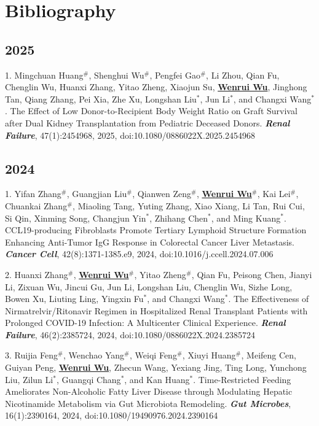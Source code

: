 \documentclass{article}
\begin{document}
\section*{Bibliography}

\subsection*{2025}

1. Mingchuan Huang$^{\#}$, Shenghui Wu$^{\#}$, Pengfei Gao$^{\#}$, Li Zhou, Qian Fu, Chenglin Wu, Huanxi Zhang, Yitao Zheng, Xiaojun Su, \underline{\textbf{Wenrui Wu}}, Jinghong Tan, Qiang Zhang, Pei Xia, Zhe Xu, Longshan Liu$^{*}$, Jun Li$^{*}$, and Changxi Wang$^{*}$. The Effect of Low Donor-to-Recipient Body Weight Ratio on Graft Survival after Dual Kidney Transplantation from Pediatric Deceased Donors. \textbf{\textit{Renal Failure}}, 47(1):2454968, 2025, doi:10.1080/0886022X.2025.2454968

\subsection*{2024}

1. Yifan Zhang$^{\#}$, Guangjian Liu$^{\#}$, Qianwen Zeng$^{\#}$, \underline{\textbf{Wenrui Wu}}$^{\#}$, Kai Lei$^{\#}$, Chuankai Zhang$^{\#}$, Miaoling Tang, Yuting Zhang, Xiao Xiang, Li Tan, Rui Cui, Si Qin, Xinming Song, Changjun Yin$^{*}$, Zhihang Chen$^{*}$, and Ming Kuang$^{*}$. CCL19-producing Fibroblasts Promote Tertiary Lymphoid Structure Formation Enhancing Anti-Tumor IgG Response in Colorectal Cancer Liver Metastasis. \textbf{\textit{Cancer Cell}}, 42(8):1371-1385.e9, 2024, doi:10.1016/j.ccell.2024.07.006

2. Huanxi Zhang$^{\#}$, \underline{\textbf{Wenrui Wu}}$^{\#}$, Yitao Zheng$^{\#}$, Qian Fu, Peisong Chen, Jianyi Li, Zixuan Wu, Jincui Gu, Jun Li, Longshan Liu, Chenglin Wu, Sizhe Long, Bowen Xu, Liuting Ling, Yingxin Fu$^{*}$, and Changxi Wang$^{*}$. The Effectiveness of Nirmatrelvir/Ritonavir Regimen in Hospitalized Renal Transplant Patients with Prolonged COVID-19 Infection: A Multicenter Clinical Experience. \textbf{\textit{Renal Failure}}, 46(2):2385724, 2024, doi:10.1080/0886022X.2024.2385724

3. Ruijia Feng$^{\#}$, Wenchao Yang$^{\#}$, Weiqi Feng$^{\#}$, Xiuyi Huang$^{\#}$, Meifeng Cen, Guiyan Peng, \underline{\textbf{Wenrui Wu}}, Zhecun Wang, Yexiang Jing, Ting Long, Yunchong Liu, Zilun Li$^{*}$, Guangqi Chang$^{*}$, and Kan Huang$^{*}$. Time-Restricted Feeding Ameliorates Non-Alcoholic Fatty Liver Disease through Modulating Hepatic Nicotinamide Metabolism via Gut Microbiota Remodeling. \textbf{\textit{Gut Microbes}}, 16(1):2390164, 2024, doi:10.1080/19490976.2024.2390164
\end{document}
